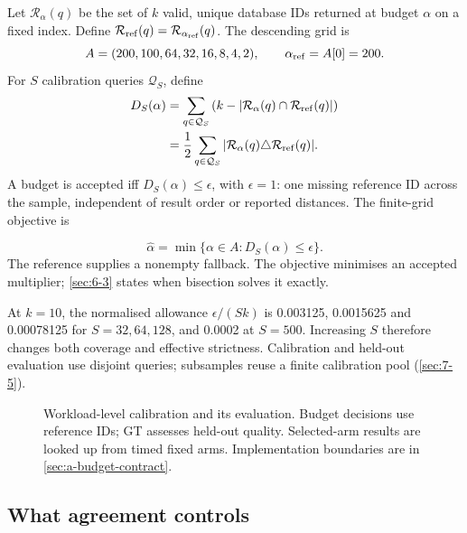 Let $\mathcal R_\alpha(q)$ be the set of $k$ valid, unique database IDs
returned at budget $\alpha$ on a fixed index. Define
$\mathcal R_{\rm ref}(q)=\mathcal R_{\alpha_{\rm ref}}(q)$. The descending grid is
\begin{equation}
 A=(200,100,64,32,16,8,4,2),\qquad \alpha_{\rm ref}=A[0]=200.
 \label{eq:6-grid}
\end{equation}
For $S$ calibration queries $\mathcal Q_S$, define
\begin{equation}
 \begin{aligned}
 D_S(\alpha)
 &=\sum_{q\in\mathcal Q_S}
   \left(k-|\mathcal R_\alpha(q)\cap\mathcal R_{\rm ref}(q)|\right)\\
 &=\frac12\sum_{q\in\mathcal Q_S}
   |\mathcal R_\alpha(q)\triangle\mathcal R_{\rm ref}(q)|.
 \end{aligned}
 \label{eq:6-agreement}
\end{equation}
A budget is accepted iff $D_S(\alpha)\leq\epsilon$, with $\epsilon=1$:
one missing reference ID across the sample, independent of result order
or reported distances. The finite-grid objective is

\begin{equation}
 \widehat\alpha=\min\{\alpha\in A:D_S(\alpha)\leq\epsilon\}.
 \label{eq:6-selection-objective}
\end{equation}
The reference supplies a nonempty fallback. The objective minimises an
accepted multiplier; \cref{sec:6-3} states when bisection solves it exactly.

At $k=10$, the normalised allowance $\epsilon/(Sk)$ is 0.003125,
0.0015625 and 0.00078125 for $S=32,64,128$, and 0.0002 at $S=500$.
Increasing $S$ therefore changes both coverage and effective strictness.
Calibration and held-out evaluation use disjoint queries; subsamples
reuse a finite calibration pool (\cref{sec:7-5}).

\begin{figure}[htbp]
\centering

\caption[Workload-level calibration and evaluation]{Workload-level calibration and its evaluation. Budget decisions
use reference IDs; GT assesses held-out quality. Selected-arm results
are looked up from timed fixed arms. Implementation boundaries are in
\cref{sec:a-budget-contract}.}
\label{fig:6-calibration}
\end{figure}

\subsection{What agreement controls}

